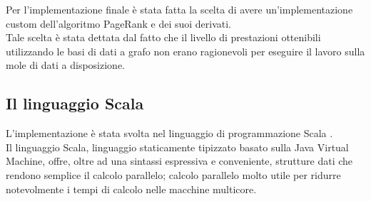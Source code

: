 \documentclass[a4paper, 12pt]{article}
\begin{document}
Per l'implementazione finale è stata fatta la scelta di avere un'implementazione custom dell'algoritmo PageRank e dei suoi derivati. \\
Tale scelta è stata dettata dal fatto che il livello di prestazioni ottenibili utilizzando le basi di dati a grafo non erano ragionevoli per eseguire il lavoro sulla mole di dati a disposizione.
\subsection{Il linguaggio Scala}
L'implementazione è stata svolta nel linguaggio di programmazione Scala \cite{scalalang}. \\
Il linguaggio Scala, linguaggio staticamente tipizzato basato sulla Java Virtual Machine, offre, oltre ad una sintassi espressiva e conveniente, strutture dati che rendono semplice il calcolo parallelo; calcolo parallelo molto utile per ridurre notevolmente i tempi di calcolo nelle macchine multicore.
\end{document}
